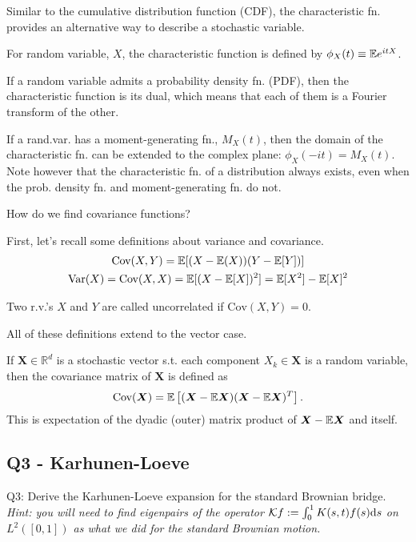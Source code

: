 \begin{quest}
\begin{ans}
	\cloze Similar to the cumulative distribution function (CDF), the characteristic fn. provides an alternative way to describe a stochastic variable. 

	\cloze For random variable, $X$, the characteristic function is defined by  $\phi_X(t) \equiv \mathbb{E} e^{itX}$.

	\cloze If a random variable admits a probability density fn. (PDF), then the characteristic function is its dual, which means that each of them is a Fourier transform of the other. 

	\cloze If a rand.var. has a moment-generating fn., $M_X(t)$, then the domain of the characteristic fn. can be extended to the complex plane: $ \phi_X(-it) = M_X(t)$. Note however that the characteristic fn. of a distribution always exists, even when the prob. density fn. and moment-generating fn. do not. 
	\end{ans}

	\item How do we find covariance functions?
	\begin{ans}
		First, let's recall some definitions about variance and covariance. 
		\cloze 
		\begin{gather*}
			\text{Cov}(X, Y) = \mathbb{E}[(X - \mathbb{E}(X))(Y - \mathbb{E}[Y])] \\
			\text{Var}(X) = \text{Cov}(X, X) = \mathbb{E}[(X - \mathbb{E}[X])^2] = \mathbb{E}[X^2] - \mathbb{E}[X]^2
		\end{gather*}

		\cloze Two r.v.'s $X$ and $Y$ are called uncorrelated if $\text{Cov}(X, Y) = 0$. 

		All of these definitions extend to the vector case. 

		\cloze If $\bm{X}\in \mathbb{R}^d$ is a stochastic vector s.t. each component $X_k \in \bm{X}$ is a random variable, then the covariance matrix of $\bm{X}$ is defined as 
		\[ \text{Cov}(\bm{X}) = \mathbb{E}\left[ (\bm{X} - \mathbb{E}\bm{X}) (\bm{X} - \mathbb{E}\bm{X})^T \right]. \]
		This is expectation of the dyadic (outer) matrix product of 
		$\bm{X} - \mathbb{E}\bm{X}$ and itself. 
	\end{ans}
\end{quest}

\subsection{Q3 - Karhunen-Loeve}
Q3: Derive the Karhunen-Loeve expansion for the standard Brownian bridge. \emph{Hint: you will need to find eigenpairs of the operator 
$\mathcal{K}f := \int_0^1 K(s,t) f(s)\text{d} s$ on $L^2([0, 1])$ as what we did for the standard Brownian motion.}

